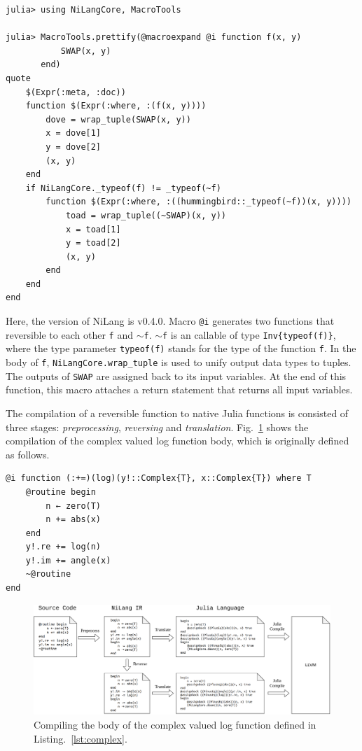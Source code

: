 \documentclass{article}
\newcommand{\<}{\langle}
\renewcommand{\>}{\rangle}
\newcommand{\Fig}[1]{Fig.~\ref{#1}}
\newcommand{\Lst}[1]{Listing.~\ref{#1}}
\theoremstyle{definition}\newtheorem{definition}{\textit{Definition}}
\begin{document}
\begin{minipage}{.88\columnwidth}
\begin{lstlisting}
julia> using NiLangCore, MacroTools

julia> MacroTools.prettify(@macroexpand @i function f(x, y)
           SWAP(x, y)
       end)
quote
    $(Expr(:meta, :doc))
    function $(Expr(:where, :(f(x, y))))
        dove = wrap_tuple(SWAP(x, y))
        x = dove[1]
        y = dove[2]
        (x, y)
    end
    if NiLangCore._typeof(f) != _typeof(~f)
        function $(Expr(:where, :((hummingbird::_typeof(~f))(x, y))))
            toad = wrap_tuple((~SWAP)(x, y))
            x = toad[1]
            y = toad[2]
            (x, y)
        end
    end
end
\end{lstlisting}
\end{minipage}

Here, the version of NiLang is v0.4.0.
Macro \texttt{@i} generates two functions that reversible to each other \texttt{f} and \texttt{$\sim$f}. \texttt{$\sim$f} is an callable of type \texttt{Inv\{typeof(f)\}}, where the type parameter \texttt{typeof(f)} stands for the type of the function \texttt{f}.
In the body of \texttt{f}, \texttt{NiLangCore.wrap\_tuple} is used to unify output data types to tuples.
The outputs of \texttt{SWAP} are assigned back to its input variables.
At the end of this function, this macro attaches a return statement that returns all input variables.

The compilation of a reversible function to native Julia functions is consisted of three stages: \textit{preprocessing}, \textit{reversing} and \textit{translation}.
\Fig{fig:compiling} shows the compilation of the complex valued log function body, which is originally defined as follows.

\begin{minipage}{.88\columnwidth}
\begin{lstlisting}[mathescape=true,caption={Reversible implementation of the complex valued log function.},label={lst:complex}]
@i function (:+=)(log)(y!::Complex{T}, x::Complex{T}) where T
    @routine begin
        n ← zero(T)
        n += abs(x)
    end
    y!.re += log(n)
    y!.im += angle(x)
    ~@routine
end
\end{lstlisting}
\end{minipage}

\begin{figure}
    \centerline{\includegraphics[width=0.95\columnwidth,trim={0cm 0cm 0cm 0cm},clip]{compiling_v2.pdf}}
    \caption{Compiling the body of the complex valued log function defined in \Lst{lst:complex}.}\label{fig:compiling}
\end{figure}
\end{document}
